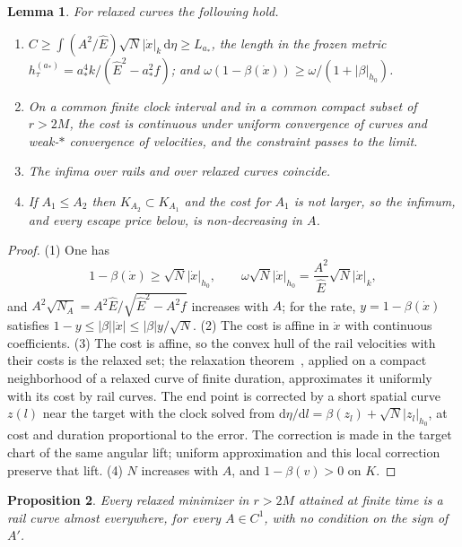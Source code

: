 \documentclass[aip,jmp,amsmath,amssymb,reprint]{revtex4-2}
\newcommand{\Ehat}{\hat E}
\newcommand{\dd}{\mathrm{d}}
\theoremstyle{plain}
\newtheorem{proposition}{Proposition}[section]
\newtheorem{lemma}[proposition]{Lemma}
\theoremstyle{definition}
\begin{document}
\begin{lemma}\label{lem:tau-eq-relax}
For relaxed curves the following hold.
\begin{enumerate}
\item $C\ge\int(A^2/\Ehat)\sqrt N|\dot x|_k\,\dd\eta\ge L_{a_*}$, the length in the frozen metric
  $h_\tau^{(a_*)}=a_*^4k/(\Ehat^2-a_*^2f)$; and $\omega(1-\beta(\dot x))\ge\omega/(1+|\beta|_{h_0})$.
\item On a common finite clock interval and in a common compact subset of $r>2M$, the cost is
  continuous under uniform convergence of curves and weak-$*$ convergence of velocities, and the
  constraint passes to the limit.
\item The infima over rails and over relaxed curves coincide.
\item If $A_1\le A_2$ then $K_{A_2}\subset K_{A_1}$ and the cost for $A_1$ is not larger, so the
  infimum, and every escape price below, is non-decreasing in $A$.
\end{enumerate}
\end{lemma}

\begin{proof}
(1) One has
\[
  1-\beta(\dot x)\ge\sqrt N|\dot x|_{h_0},\qquad \omega\sqrt N|\dot x|_{h_0}=\frac{A^2}{\Ehat}\sqrt N|\dot x|_k,
\]
and $A^2\sqrt{N_A}=A^2\Ehat/\sqrt{\Ehat^2-A^2f}$ increases with $A$; for the rate, $y=1-\beta(\dot x)$ satisfies
$1-y\le|\beta||\dot x|\le|\beta|y/\sqrt N$. (2) The cost is affine in $\dot x$ with continuous
coefficients. (3) The cost is affine, so the convex hull of the rail velocities with their costs
is the relaxed set; the relaxation theorem~\cite[Theorem~2.7.2]{Vinter2000}, applied on a compact
neighborhood of a relaxed curve of finite duration, approximates it uniformly with its cost by
rail curves. The end point is corrected by a short spatial curve $z(l)$ near the target with
the clock solved from $\dd\eta/\dd l=\beta(z_l)+\sqrt N|z_l|_{h_0}$, at cost and duration
proportional to the error. The correction is made in the target chart of the same angular lift;
uniform approximation and this local correction preserve that lift. (4) $N$ increases with $A$, and $1-\beta(v)>0$ on $K$.
\end{proof}

\begin{proposition}\label{prop:tau-eq-rail}
Every relaxed minimizer in $r>2M$ attained at finite time is a rail curve almost everywhere,
for every $A\in C^1$, with no condition on the sign of $A'$.
\end{proposition}
\end{document}
